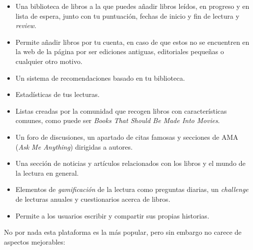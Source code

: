 \begin{itemize}
    \item Una biblioteca de libros a la que puedes añadir libros leídos, en progreso y en lista de espera, junto con tu puntuación, fechas de inicio y fin de lectura y \textit{review}.
    \item Permite añadir libros por tu cuenta, en caso de que estos no se encuentren en la web de la página por ser ediciones antiguas, editoriales pequeñas o cualquier otro motivo.
    \item Un sistema de recomendaciones basado en tu biblioteca.
    \item Estadísticas de tus lecturas.
    \item Listas creadas por la comunidad que recogen libros con características comunes, como puede ser \textit{Books That Should Be Made Into Movies}.
    \item Un foro de discusiones, un apartado de citas famosas y secciones de AMA (\textit{Ask Me Anything}) dirigidas a autores.
    \item Una sección de noticias y artículos relacionados con los libros y el mundo de la lectura en general.
    \item Elementos de \textit{gamificación} de la lectura como preguntas diarias, un \textit{challenge} de lecturas anuales y cuestionarios acerca de libros.
    \item Permite a los usuarios escribir y compartir sus propias historias.
\end{itemize}

No por nada esta plataforma es la más popular, pero sin embargo no carece de aspectos mejorables:

